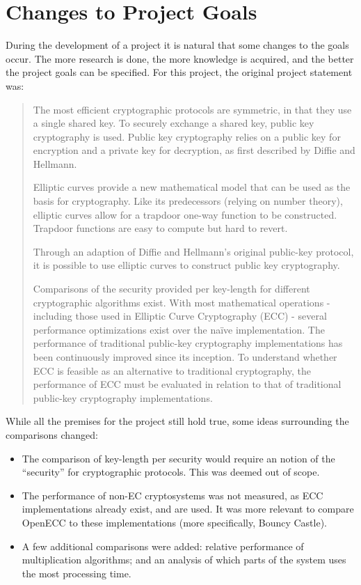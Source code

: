 \section{Changes to Project Goals}

During the development of a project it is natural that some changes to the goals occur. The more research is done,
the more knowledge is acquired, and the better the project goals can be specified. For this project, the original
project statement was:

\begin{quote}
	The most efficient cryptographic protocols are symmetric, in that they use a single shared key. To securely exchange a shared key, public key cryptography is used. Public key cryptography relies on a public key for encryption and a private key for decryption, as first described by Diffie and Hellmann.

	Elliptic curves provide a new mathematical model that can be used as the basis for cryptography. Like its predecessors (relying on number theory), elliptic curves allow for a trapdoor one-way function to be constructed. Trapdoor functions are easy to compute but hard to revert.

	Through an adaption of Diffie and Hellmann’s original public-key protocol, it is possible to use elliptic curves to construct public key cryptography.

	Comparisons of the security provided per key-length for different cryptographic algorithms exist. With most mathematical operations - including those used in Elliptic Curve Cryptography (ECC) - several performance optimizations exist over the naïve implementation. The performance of traditional public-key cryptography implementations has been continuously improved since its inception. To understand whether ECC is feasible as an alternative to traditional cryptography, the performance of ECC must be evaluated in relation to that of traditional public-key cryptography implementations.
\end{quote}

While all the premises for the project still hold true, some ideas surrounding the comparisons changed:

\begin{itemize}
	\item The comparison of key-length per security would require an notion of the ``security'' for cryptographic protocols.
		This was deemed out of scope.
	\item The performance of non-EC cryptosystems was not measured, as ECC implementations already exist, and are used. It was
		more relevant to compare OpenECC to these implementations (more specifically, Bouncy Castle).
	\item A few additional comparisons were added: relative performance of multiplication algorithms; and an analysis of which
		parts of the system uses the most processing time.
\end{itemize}